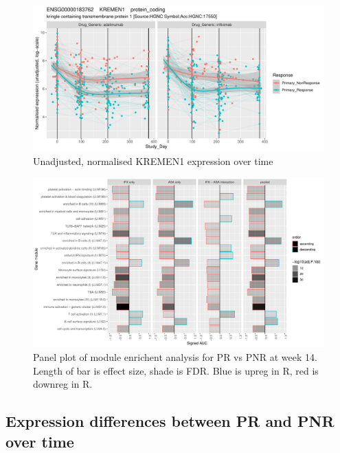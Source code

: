 \begin{outline}
\begin{figure}
    \centering
    \includegraphics[width=1.0\textwidth,page=1]{mainmatter/figures/chapter_04/dream.E_vs_Study_Day.GENEID_ENSG00000183762.SYMBOL_KREMEN1.pdf}
    \caption{Unadjusted, normalised KREMEN1 expression over time}
    \label{fig:multipants_dge_KREMEN1}
\end{figure}

\begin{figure}
    \centering
    \includegraphics[width=1.0\textwidth,page=1]{mainmatter/figures/chapter_04/plot_gene_set_enrichment.tmodCERNO_panelplot_C_3RI_3NI,C_3RA_3NA,C_(3RI_3NI)_(3RA_3NA),C_3R_3N.pdf}
    \caption{Panel plot of module enrichent analysis for PR vs PNR at week 14. Length of bar is effect size, shade is FDR. Blue is upreg in R, red is downreg in R.}
    \label{fig:multipants_dge_panelPlot_week_14_R_N}
\end{figure}

\subsection{Expression differences between PR and PNR over time}


\end{outline}
